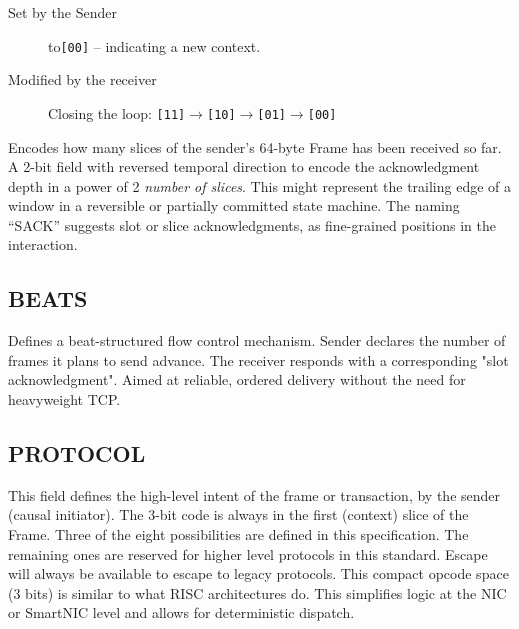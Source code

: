 \documentclass[../OAE-SPEC-MAIN.tex]{subfiles}
\begin{document}
\begin{description}
\item [Set by the Sender] to\texttt{[00]} --  indicating a  new context.
\item [Modified by the receiver] Closing the loop: \texttt{[11]$\rightarrow$[10]$\rightarrow$[01]$\rightarrow$[00]} %
\end{description}

Encodes how many slices of the sender’s 64-byte Frame has been received so far. A 2-bit field with reversed temporal direction to encode the acknowledgment depth in a power of 2 \emph{number of slices}. This might represent the trailing edge of a window in a reversible or partially committed state machine. The naming “SACK”  suggests  slot or slice acknowledgments, as fine-grained positions in the interaction. 


\subsection{BEATS}


Defines a beat-structured flow control mechanism.  Sender declares the number of frames it plans to send advance. The receiver responds with a corresponding "slot acknowledgment".  Aimed at reliable, ordered delivery without the need for heavyweight TCP.


\subsection{PROTOCOL}

This field defines the high-level intent of the frame or transaction, by the sender (causal initiator). The 3-bit code is always in the first (context) slice of the Frame. Three of the eight possibilities are defined in this specification. The remaining ones are reserved for higher level protocols in this standard.  Escape will always be available to escape to legacy protocols. This compact opcode space (3 bits) is similar to what RISC architectures do. This simplifies logic at the NIC or SmartNIC level and allows for deterministic dispatch.
\end{document}
